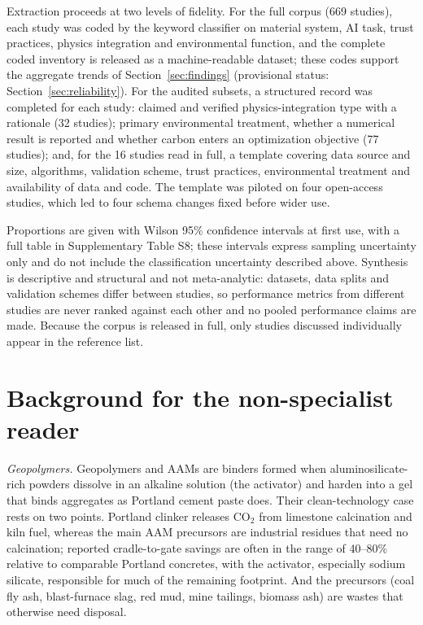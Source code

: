 \documentclass[pdflatex,sn-basic]{sn-jnl}
\begin{document}
Extraction proceeds at two levels of fidelity. For the full corpus (669 studies), each study was coded by the keyword classifier on material system, AI task, trust practices, physics integration and environmental function, and the complete coded inventory is released as a machine-readable dataset; these codes support the aggregate trends of Section~\ref{sec:findings} (provisional status: Section~\ref{sec:reliability}). For the audited subsets, a structured record was completed for each study: claimed and verified physics-integration type with a rationale (32 studies); primary environmental treatment, whether a numerical result is reported and whether carbon enters an optimization objective (77 studies); and, for the 16 studies read in full, a template covering data source and size, algorithms, validation scheme, trust practices, environmental treatment and availability of data and code. The template was piloted on four open-access studies, which led to four schema changes fixed before wider use.

Proportions are given with Wilson 95\% confidence intervals at first use, with a full table in Supplementary Table S8; these intervals express sampling uncertainty only and do not include the classification uncertainty described above. Synthesis is descriptive and structural and not meta-analytic: datasets, data splits and validation schemes differ between studies, so performance metrics from different studies are never ranked against each other and no pooled performance claims are made. Because the corpus is released in full, only studies discussed individually appear in the reference list.

\section{Background for the non-specialist reader}\label{sec:background}

\emph{Geopolymers.} Geopolymers and AAMs are binders formed when aluminosilicate-rich powders dissolve in an alkaline solution (the activator) and harden into a gel that binds aggregates as Portland cement paste does. Their clean-technology case rests on two points. Portland clinker releases CO$_2$ from limestone calcination and kiln fuel, whereas the main AAM precursors are industrial residues that need no calcination; reported cradle-to-gate savings are often in the range of 40--80\% relative to comparable Portland concretes, with the activator, especially sodium silicate, responsible for much of the remaining footprint. And the precursors (coal fly ash, blast-furnace slag, red mud, mine tailings, biomass ash) are wastes that otherwise need disposal.
\end{document}
